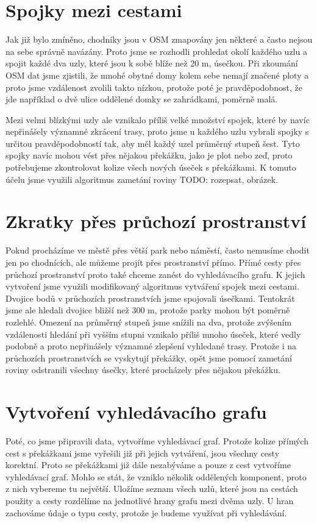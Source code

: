 \section{Spojky mezi cestami}
Jak již bylo zmíněno, chodníky jsou v OSM zmapovány jen některé a často nejsou
na sebe správně navázány. Proto jsme se rozhodli prohledat okolí každého uzlu a
spojit každé dva uzly, které jsou k sobě blíže než 20 m, úsečkou. Při zkoumání
OSM dat jsme zjistili, že mnohé obytné domy kolem sebe nemají značené ploty a
proto jsme vzdálenost zvolili takto nízkou, protože poté je pravděpodobnost, že
jde například o dvě ulice oddělené domky se zahrádkami, poměrně malá.  

Mezi velmi blízkými uzly ale vznikalo příliš velké množství spojek, které by
navíc nepřinášely významné zkrácení trasy, proto jsme u každého uzlu vybrali
spojky s určitou pravděpodobností tak, aby měl každý uzel průměrný stupeň šest.
Tyto spojky navíc mohou vést přes nějakou překážku, jako je plot nebo zeď, proto
potřebujeme zkontrolovat kolize všech nových úseček s překážkami. K tomuto účelu
jsme využili algoritmus zametání roviny TODO: rozepsat, obrázek.  

\section{Zkratky přes průchozí prostranství}
Pokud procházíme ve městě přes větší park nebo náměstí, často nemusíme chodit
jen po chodnících, ale můžeme projít přes prostranství přímo. Přímé cesty přes
průchozí prostranství proto také chceme zanést do vyhledávacího grafu. K jejich
vytvoření jsme využili modifikovaný algoritmus vytváření spojek mezi cestami.
Dvojice bodů v průchozích prostranstvích jsme spojovali úsečkami. Tentokrát jsme
ale hledali dvojice bližší než 300 m, protože parky mohou být poměrně rozlehlé.
Omezení na průměrný stupeň jsme snížili na dva, protože zvýšením vzdálenosti
hledání při vyšším stupni vznikalo příliš mnoho úseček, které vedly podobně a
proto nepřinášely významné zlepšení vyhledané trasy. Protože i na průchozích
prostranstvích se vyskytují překážky, opět jsme pomocí zametání roviny
odstranili všechny úsečky, které procházely přes nějakou překážku.

\section{Vytvoření vyhledávacího grafu}
Poté, co jsme připravili data, vytvoříme vyhledávací graf. Protože kolize
přímých cest s překážkami jsme vyřešili již při jejich vytváření, jsou všechny
cesty korektní. Proto se překážkami již dále nezabýváme a pouze z cest vytvoříme
vyhledávací graf. Mohlo se stát, že vzniklo několik oddělených komponent, proto
z nich vybereme tu největší. Uložíme seznam všech uzlů, které jsou na cestách
použity a cesty rozdělíme na jednotlivé hrany grafu mezi dvěma uzly. U hran
zachováme údaje o typu cesty, protože je budeme využívat při vyhledávání.
